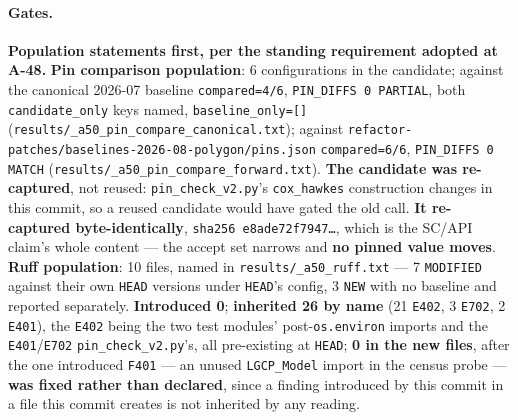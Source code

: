 \documentclass[
  10pt,
]{article}
\begin{document}
\paragraph{Gates.}
\textbf{Population statements first, per the standing requirement adopted at A-48.} \textbf{Pin comparison population}: 6 configurations in the candidate; against the canonical 2026-07 baseline \texttt{compared=4/6}, \texttt{PIN\_DIFFS 0 PARTIAL}, both \texttt{candidate\_only} keys named, \texttt{baseline\_only=[]} (\texttt{results/\allowbreak{}\_a50\_pin\_compare\_canonical.txt}); against \texttt{refactor-patches/\allowbreak{}baselines-2026-08-polygon/\allowbreak{}pins.json} \texttt{compared=6/6}, \texttt{PIN\_DIFFS 0 MATCH} (\texttt{results/\allowbreak{}\_a50\_pin\_compare\_forward.txt}). \textbf{The candidate was re-captured}, not reused: \texttt{pin\_check\_v2.py}'s \texttt{cox\_hawkes} construction changes in this commit, so a reused candidate would have gated the old call. \textbf{It re-captured byte-identically}, \texttt{sha256 e8ade72f7947\dots}, which is the SC/API claim's whole content --- the accept set narrows and \textbf{no pinned value moves}. \textbf{Ruff population}: 10 files, named in \texttt{results/\allowbreak{}\_a50\_ruff.txt} --- 7 \texttt{MODIFIED} against their own \texttt{HEAD} versions under \texttt{HEAD}'s config, 3 \texttt{NEW} with no baseline and reported separately. \textbf{Introduced 0}; \textbf{inherited 26 by name} (21 \texttt{E402}, 3 \texttt{E702}, 2 \texttt{E401}), the \texttt{E402} being the two test modules' post-\texttt{os.environ} imports and the \texttt{E401}/\texttt{E702} \texttt{pin\_check\_v2.py}'s, all pre-existing at \texttt{HEAD}; \textbf{0 in the new files}, after the one introduced \texttt{F401} --- an unused \texttt{LGCP\_Model} import in the census probe --- \textbf{was fixed rather than declared}, since a finding introduced by this commit in a file this commit creates is not inherited by any reading.
\end{document}
